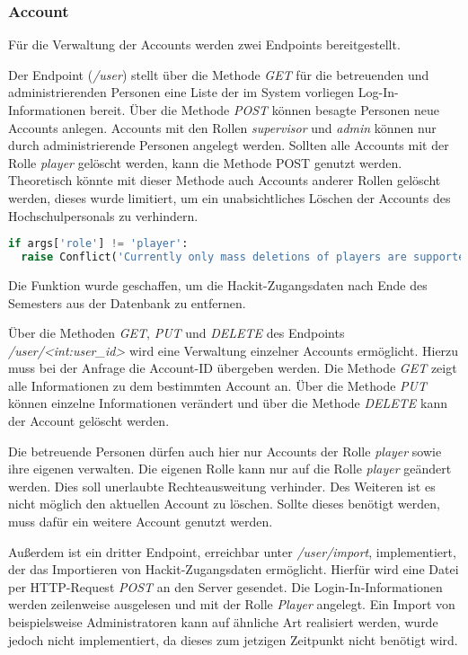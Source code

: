 \subsubsection{Account}
Für die Verwaltung der Accounts werden zwei Endpoints bereitgestellt. 

Der Endpoint (\textit{/user}) stellt über die Methode \textit{GET} für die betreuenden und administrierenden Personen eine Liste der im System vorliegen Log-In-Informationen bereit. Über die Methode \textit{POST} können besagte Personen neue Accounts anlegen. Accounts mit den Rollen \textit{supervisor} und \textit{admin} können nur durch administrierende Personen angelegt werden. Sollten alle Accounts mit der Rolle \textit{player} gelöscht werden, kann die Methode POST genutzt werden. Theoretisch könnte mit dieser Methode auch Accounts anderer Rollen gelöscht werden, dieses wurde limitiert, um ein unabsichtliches Löschen der Accounts des Hochschulpersonals zu verhindern.

\begin{lstlisting}[language=Python, frame=single, caption={GIS Löschen auf player-Accounts begrenzen}, captionpos=b, label={lst:gis-delete-all-players}]
if args['role'] != 'player':
  raise Conflict('Currently only mass deletions of players are supported.')
\end{lstlisting}

Die Funktion wurde geschaffen, um die Hackit-Zugangsdaten nach Ende des Semesters aus der Datenbank zu entfernen.

Über die Methoden \textit{GET}, \textit{PUT} und \textit{DELETE} des Endpoints \textit{/user/<int:user\_id>} wird eine Verwaltung einzelner Accounts ermöglicht. Hierzu muss bei der Anfrage die Account-ID übergeben werden. Die Methode \textit{GET} zeigt alle Informationen zu dem bestimmten Account an. Über die Methode \textit{PUT} können einzelne Informationen verändert und über die Methode \textit{DELETE} kann der Account gelöscht werden.

Die betreuende Personen dürfen auch hier nur Accounts der Rolle \textit{player} sowie ihre eigenen verwalten. Die eigenen Rolle kann nur auf die Rolle \textit{player} geändert werden. Dies soll unerlaubte Rechteausweitung verhinder. Des Weiteren ist es nicht möglich den aktuellen Account zu löschen. Sollte dieses benötigt werden, muss dafür ein weitere Account genutzt werden.

Außerdem ist ein dritter Endpoint, erreichbar unter \textit{/user/import}, implementiert, der das Importieren von Hackit-Zugangsdaten ermöglicht. Hierfür wird eine Datei per HTTP-Request \textit{POST} an den Server gesendet. Die Login-In-Informationen werden zeilenweise ausgelesen und mit der Rolle \textit{Player} angelegt. Ein Import von beispielsweise Administratoren kann auf ähnliche Art realisiert werden, wurde jedoch nicht implementiert, da dieses zum jetzigen Zeitpunkt nicht benötigt wird.

